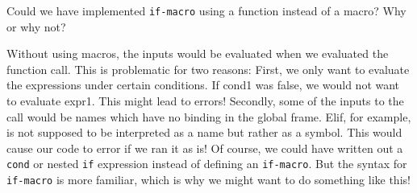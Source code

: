 \begin{blocksection}
\question Could we have implemented \texttt{if-macro} using a function instead of a macro? Why or why not?
\begin{solution}[0.5in]
Without using macros, the inputs would be evaluated when we evaluated the function call. This is problematic for two reasons:
\newline
First, we only want to evaluate the expressions under certain conditions. If cond1 was false, we would not want to evaluate expr1. This might lead to errors!
\newline
Secondly, some of the inputs to the call would be names which have no binding in the global frame. Elif, for example, is not supposed to be interpreted as a name
but rather as a symbol. This would cause our code to error if we ran it as is!
\newline
Of course, we could have written out a \texttt{cond} or nested \texttt{if} expression instead of defining an \texttt{if-macro}. But the syntax for \texttt{if-macro} 
is more familiar, which is why we might want to do something like this!
\end{solution}
\end{blocksection}